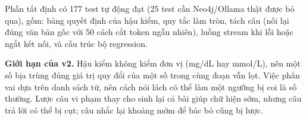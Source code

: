 Phần tất định có 177 test tự động đạt (25 test cần Neo4j/Ollama thật được bỏ qua), gồm: bảng quyết định của hậu kiểm, quy tắc làm tròn, tách câu (nối lại đúng văn bản gốc với 50 cách cắt token ngẫu nhiên), luồng stream khi lỗi hoặc ngắt kết nối, và cấu trúc bộ regression.

\textbf{Giới hạn của v2.} Hậu kiểm không kiểm đơn vị (mg/dL hay mmol/L), nên một số bịa trùng đúng giá trị quy đổi của một số trong cùng đoạn vẫn lọt. Việc phân vai dựa trên danh sách từ, nên cách nói lách có thể làm một ngưỡng bị coi là số thường. Lược câu vi phạm thay cho sinh lại cả bài giúp chữ hiện sớm, nhưng câu trả lời có thể bị cụt; câu nhắc lại khoảng mớm để bác bỏ cũng bị lược.
